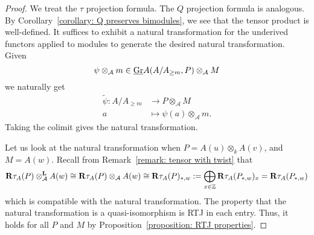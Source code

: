 \begin{proof}
  We treat the \(\tau\) projection formula. The \(Q\) projection formula is analogous. By Corollary~\ref{corollary: Q preserves bimodules}, we see that the tensor product is well-defined. It suffices to exhibit a natural transformation for the underived functors applied to modules to generate the desired natural transformation. Given
  \begin{displaymath}
    \psi \otimes_{\mathcal A} m \in \underline{\operatorname{Gr}}A(A/A_{\geq m}, P) \otimes_{\mathcal A} M 
  \end{displaymath}
  we naturally get 
  \begin{align*}
    \widetilde{\psi} : A/A_{\geq m} & \to P \otimes_{\mathcal A} M \\
    a & \mapsto \psi(a) \otimes_{\mathcal A} m. 
  \end{align*}
  Taking the colimit gives the natural transformation.
  
  Let us look at the natural transformation when \(P = A(u) \otimes_k A(v)\), and \(M = A(w)\).
  Recall from Remark~\ref{remark: tensor with twist} that
  \[
  \mathbf{R}\tau_A(P) \otimes_{\mathcal{A}}^\mathbf{L} A(w) \cong \mathbf{R}\tau_A(P) \otimes_{\mathcal{A}} A(w) \cong \mathbf{R}\tau_A(P)_{\ast,w} 
  := \bigoplus_{x \in \mathbb{Z}} \mathbf{R}\tau_A(P_{\ast,w})_x
  = \mathbf{R}\tau_A(P_{\ast,w})
  \]
  which is compatible with the natural transformation.
  The property that the natural transformation is a quasi-isomorphism is RTJ in each entry.
  Thus, it holds for all \(P\) and \(M\) by Proposition~\ref{proposition: RTJ properties}.
\end{proof}

